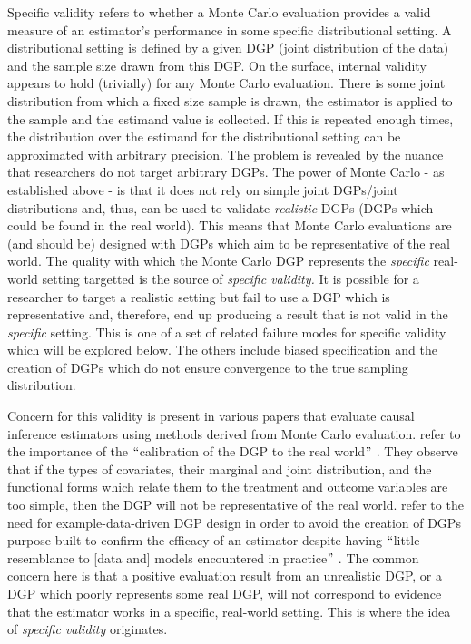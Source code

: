 \documentclass[../main.tex]{subfiles}
\begin{document}
Specific validity refers to whether a Monte Carlo evaluation provides a valid measure of an estimator’s performance in some specific distributional setting. A distributional setting is defined by a given DGP (joint distribution of the data) and the sample size drawn from this DGP. On the surface, internal validity appears to hold (trivially) for any Monte Carlo evaluation. There is some joint distribution from which a fixed size sample is drawn, the estimator is applied to the sample and the estimand value is collected. If this is repeated enough times, the distribution over the estimand for the distributional setting can be approximated with arbitrary precision. The problem is revealed by the nuance that researchers do not target arbitrary DGPs. The power of Monte Carlo - as established above - is that it does not rely on simple joint DGPs/joint distributions and, thus, can be used to validate \textit{realistic} DGPs (DGPs which could be found in the real world). This means that Monte Carlo evaluations are (and should be) designed with DGPs which aim to be representative of the real world. The quality with which the Monte Carlo DGP represents the \textit{specific }real-world setting targetted is the source of \textit{specific validity. }It is possible for a researcher to target a realistic setting but fail to use a DGP which is representative and, therefore, end up producing a result that is not valid in the \textit{specific }setting. This is one of a set of related failure modes for specific validity which will be explored below. The others include biased specification and the creation of DGPs which do not ensure convergence to the true sampling distribution.\par


\vspace{\baselineskip}
Concern for this validity is present in various papers that evaluate causal inference estimators using methods derived from Monte Carlo evaluation. \cite{Dorie2019Automated1} refer to the importance of the $``$calibration of the DGP to the real world$"$ . They observe that if the types of covariates, their marginal and joint distribution, and the functional forms which relate them to the treatment and outcome variables are too simple, then the DGP will not be representative of the real world. \cite{Paxton2001MonteImplementation} refer to the need for example-data-driven DGP design in order to avoid the creation of DGPs purpose-built to confirm the efficacy of an estimator despite having $``$little resemblance to [data and] models encountered in practice$"$ . The common concern here is that a positive evaluation result from an unrealistic DGP, or a DGP which poorly represents some real DGP, will not correspond to evidence that the estimator works in a specific, real-world setting. This is where the idea of \textit{specific validity }originates.\par
\end{document}
